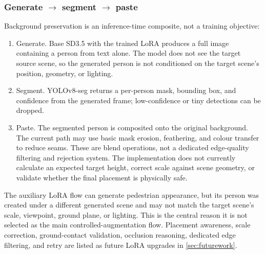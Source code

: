 \documentclass[11pt,a4paper]{article}
\begin{document}
\subsubsection*{Generate $\to$ segment $\to$ paste}
Background preservation is an inference-time composite, not a training objective:
\begin{enumerate}[leftmargin=1.6em,itemsep=2pt]
  \item Generate. Base SD3.5 with the trained LoRA produces a full image containing a person from text alone. The model does not see the target source scene, so the generated person is not conditioned on the target scene's position, geometry, or lighting.
  \item Segment. YOLOv8-seg returns a per-person mask, bounding box, and confidence from the generated frame; low-confidence or tiny detections can be dropped.
  \item Paste. The segmented person is composited onto the original background. The current path may use basic mask erosion, feathering, and colour transfer to reduce seams. These are blend operations, not a dedicated edge-quality filtering and rejection system. The implementation does not currently calculate an expected target height, correct scale against scene geometry, or validate whether the final placement is physically safe.
\end{enumerate}

The auxiliary LoRA flow can generate pedestrian appearance, but its person was created under a different generated scene and may not match the target scene's scale, viewpoint, ground plane, or lighting. This is the central reason it is not selected as the main controlled-augmentation flow. Placement awareness, scale correction, ground-contact validation, occlusion reasoning, dedicated edge filtering, and retry are listed as future LoRA upgrades in \cref{sec:futurework}.
\end{document}
